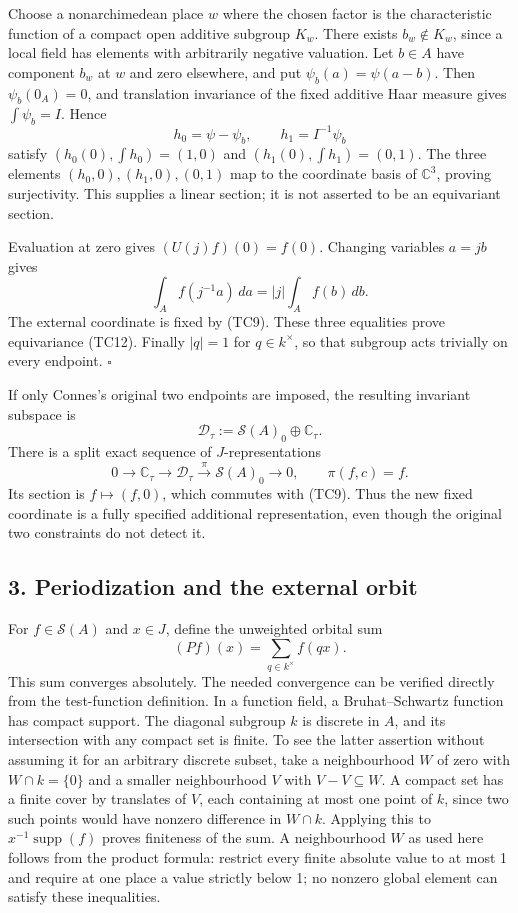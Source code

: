 \documentclass[
  10pt,
]{article}
\begin{document}
Choose a nonarchimedean place \(w\) where the chosen factor is the
characteristic function of a compact open additive subgroup \(K_w\).
There exists \(b_w\notin K_w\), since a local field has elements with
arbitrarily negative valuation. Let \(b\in A\) have component \(b_w\) at
\(w\) and zero elsewhere, and put \(\psi_b(a)=\psi(a-b)\). Then
\(\psi_b(0_A)=0\), and translation invariance of the fixed additive Haar
measure gives \(\int\psi_b=I\). Hence \[
h_0=\psi-\psi_b,\qquad h_1=I^{-1}\psi_b
\tag{TC14}
\] satisfy \((h_0(0),\int h_0)=(1,0)\) and \((h_1(0),\int h_1)=(0,1)\).
The three elements \((h_0,0),(h_1,0),(0,1)\) map to the coordinate basis
of \(\mathbb C^3\), proving surjectivity. This supplies a linear
section; it is not asserted to be an equivariant section.

Evaluation at zero gives \((U(j)f)(0)=f(0)\). Changing variables
\(a=jb\) gives \[
\int_A f(j^{-1}a)\,da=|j|\int_A f(b)\,db.
\tag{TC15}
\] The external coordinate is fixed by (TC9). These three equalities
prove equivariance (TC12). Finally \(|q|=1\) for \(q\in k^\times\), so
that subgroup acts trivially on every endpoint. \(\square\)

If only Connes's original two endpoints are imposed, the resulting
invariant subspace is \[
\mathcal D_\tau:=\mathcal S(A)_0\oplus\mathbb C_\tau.
\tag{TC16}
\] There is a split exact sequence of \(J\)-representations \[
0\longrightarrow\mathbb C_\tau
\longrightarrow\mathcal D_\tau
\xrightarrow{\pi}\mathcal S(A)_0\longrightarrow0,
\qquad\pi(f,c)=f.
\tag{TC17}
\] Its section is \(f\mapsto(f,0)\), which commutes with (TC9). Thus the
new fixed coordinate is a fully specified additional representation,
even though the original two constraints do not detect it.

\subsection{3. Periodization and the external
orbit}\label{periodization-and-the-external-orbit}

For \(f\in\mathcal S(A)\) and \(x\in J\), define the unweighted orbital
sum \[
(Pf)(x)=\sum_{q\in k^\times}f(qx).
\tag{TC18}
\] This sum converges absolutely. The needed convergence can be verified
directly from the test-function definition. In a function field, a
Bruhat--Schwartz function has compact support. The diagonal subgroup
\(k\) is discrete in \(A\), and its intersection with any compact set is
finite. To see the latter assertion without assuming it for an arbitrary
discrete subset, take a neighbourhood \(W\) of zero with
\(W\cap k=\{0\}\) and a smaller neighbourhood \(V\) with
\(V-V\subseteq W\). A compact set has a finite cover by translates of
\(V\), each containing at most one point of \(k\), since two such points
would have nonzero difference in \(W\cap k\). Applying this to
\(x^{-1}\operatorname{supp}(f)\) proves finiteness of the sum. A
neighbourhood \(W\) as used here follows from the product formula:
restrict every finite absolute value to at most 1 and require at one
place a value strictly below 1; no nonzero global element can satisfy
these inequalities.
\end{document}
